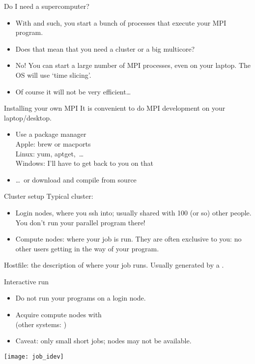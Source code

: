 \begin{numberedframe}{Do I need a supercomputer?}
  \begin{itemize}
  \item With  and such, you start a bunch of processes that
    execute your MPI program.
  \item Does that mean that you need a cluster or a big multicore?
  \item No! You can start a large number of MPI processes, even on
    your laptop. The OS will use `time slicing'.
  \item Of course it will not be very efficient\ldots
  \end{itemize}
\end{numberedframe}

\begin{numberedframe}{Installing your own MPI}
  It is convenient to do MPI development on your laptop/desktop.
  \begin{itemize}
  \item Use a package manager\\
    Apple: brew or macports\\
    Linux: yum, aptget,~\ldots\\
    Windows: I'll have to get back to you on that
  \item \ldots~or download and compile from source 
  \end{itemize}
\end{numberedframe}

\begin{numberedframe}{Cluster setup}
  \small
  Typical cluster:
  \begin{itemize}
  \item Login nodes, where you ssh into; usually shared with 100 (or
    so) other people. You don't run your parallel program there!
  \item Compute nodes: where your job is run. They are often exclusive
    to you: no other users getting in the way of your program.
  \end{itemize}
  Hostfile: the description of where your job runs. Usually generated
  by a .
\end{numberedframe}

\begin{numberedframe}{Interactive run}
  \begin{itemize}
  \item Do not run your programs on a login node.
  \item Acquire compute nodes with  \\
    (other systems: )
  \item Caveat: only small short jobs; nodes may not be available.
  \end{itemize}
  \texttt{[image: job\_idev]}
\end{numberedframe}

